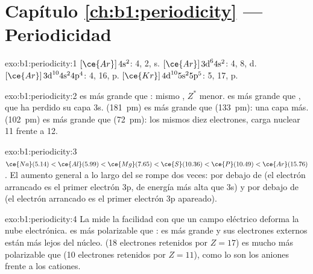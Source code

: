 \section*{Capítulo \ref{ch:b1:periodicity} --- Periodicidad}

\begin{solution}{exo:b1:periodicity:1}
 $[\ce{Ar}]\,4\text{s}^2$:  4,  2,  s. 
$[\ce{Ar}]\,3\text{d}^6 4\text{s}^2$:  4,  8,  d. 
$[\ce{Ar}]\,3\text{d}^{10} 4\text{s}^2 4\text{p}^4$:  4,  16,
 p.  $[\ce{Kr}]\,4\text{d}^{10} 5\text{s}^2 5\text{p}^5$:
 5,  17,  p.
\end{solution}

\begin{solution}{exo:b1:periodicity:2}
 es más grande que : mismo , $Z^{*}$ menor. 
es más grande que , que ha perdido su capa 3s. 
(\qty{181}{pm}) es más grande que  (\qty{133}{pm}): una capa más.
 (\qty{102}{pm}) es más grande que  (\qty{72}{pm}):
los mismos diez electrones, carga nuclear 11 frente a 12.
\end{solution}

\begin{solution}{exo:b1:periodicity:3}
$\ce{Na} (5.14) < \ce{Al} (5.99) < \ce{Mg} (7.65) < \ce{S} (10.36) <
\ce{P} (10.49) < \ce{Ar} (15.76)$. El aumento general a lo largo del
 se rompe dos veces:  por debajo de  (el electrón
arrancado es el primer electrón 3p, de energía más alta que 3s) y 
por debajo de  (el electrón arrancado es el primer electrón 3p
apareado).
\end{solution}

\begin{solution}{exo:b1:periodicity:4}
La  mide la facilidad con que un campo eléctrico deforma
la nube electrónica.  es más polarizable que : es más
grande y sus electrones externos están más lejos del núcleo.  (18
electrones retenidos por $Z = 17$) es mucho más polarizable que 
(10 electrones retenidos por $Z = 11$), como lo son los aniones frente a
los cationes.
\end{solution}


